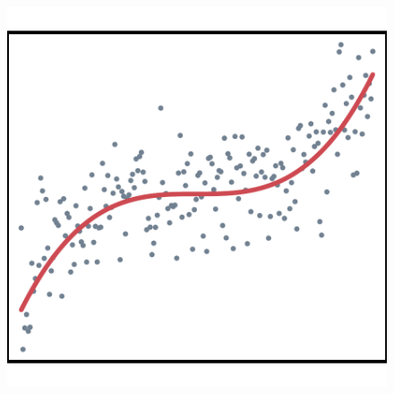 \documentclass[11pt,t,usepdftitle=false,aspectratio=169]{beamer}
\begin{document}
\begin{frame}
\begin{figure}[!htb]
\begin{center}
{\includegraphics{slides-plot_motivation_GAM}
}
\end{center}
\endminipage
{}
\begin{center}
\end{center}
\endminipage


\end{figure}
\end{frame}
\end{document}
